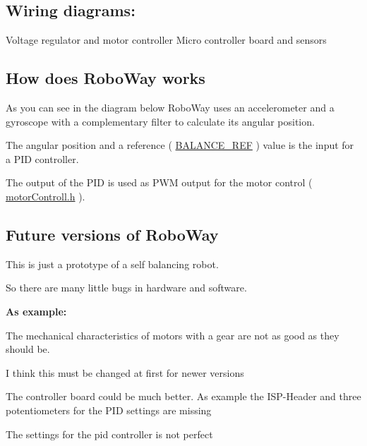 \par


\subsection*{\-Wiring diagrams\-:}

 \-Voltage regulator and motor controller \-Micro controller board and sensors 

\par
\par
  \subsection*{\-How does \-Robo\-Way works}

  \-As you can see in the diagram below \-Robo\-Way uses an accelerometer and a gyroscope with a complementary filter to calculate its angular position.\par
 \-The angular position and a reference ( \hyperlink{robo_way_8h_a3baf8ebdb03329405535684ceecbb40a}{\-B\-A\-L\-A\-N\-C\-E\-\_\-\-R\-E\-F} ) value is the input for a \-P\-I\-D controller.\par
 \-The output of the \-P\-I\-D is used as \-P\-W\-M output for the motor control ( \hyperlink{motor_controll_8h}{motor\-Controll.\-h} ).      

\par
 

\par


\subsection*{\-Future versions of \-Robo\-Way}

\-This is just a prototype of a self balancing robot.\par
 \-So there are many little bugs in hardware and software.\par
\par
 {\bfseries \-As example\-:} 
\begin{DoxyItemize}
\item \-The mechanical characteristics of motors with a gear are not as good as they should be.\par
 \-I think this must be changed at first for newer versions  
\item \-The controller board could be much better. \-As example the \-I\-S\-P-\/\-Header and three potentiometers for the \-P\-I\-D settings are missing  
\item \-The settings for the pid controller is not perfect  
\end{DoxyItemize}


